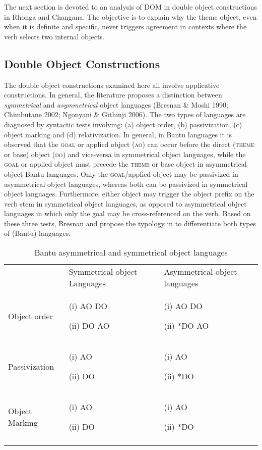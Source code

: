 \documentclass[output=paper]{langsci/langscibook}
\begin{document}
The next section is devoted to an analysis of DOM in double object constructions in Rhonga and Changana. The objective is to explain why the theme object, even when it is definite and specific, never triggers agreement in contexts where the verb selects two internal objects.

\subsection{Double Object Constructions}

{The d}ouble object constructions examined here all involve applicative constructions. {In general, }the literature proposes a distinction between \textit{symmetrical} and \textit{asymmetrical} object languages (Bresnan \& Moshi 1990; Chimbutane 2002; Ngonyani \& Githinji 2006). The two types of languages are diagnosed by syntactic tests involving: (a) object order, (b) passivization, (c) object marking and (d) relativization. In general, in Bantu languages it is observed that the \textsc{goal} or applied object (\textsc{ao}) can occur before the direct (\textsc{theme} or base) object (\textsc{do}) and vice-versa in symmetrical object languages, while the \textsc{goal} or applied object must precede the \textsc{theme} or base object in asymmetrical object Bantu languages. Only the \textsc{goal}/applied object may be passivized in asymmetrical object languages, whereas both can be passivized in symmetrical object languages. Furthermore, either object may trigger the object prefix on the verb stem in symmetrical object languages, as opposed to asymmetrical object languages in which only the goal may be cross-referenced on the verb. Based on these three tests, Bresnan and \citet{Moshi1990} propose the typology in  to differentiate both types of (Bantu) languages.

\begin{table}
\caption{Bantu asymmetrical and symmetrical object languages}
\label{tab:3}


\begin{tabularx}{\textwidth}{XXX} & Symmetrical object Languages& Asymmetrical object languages\\
\lsptoprule
 Object order& {(i) AO DO}

 (ii) DO AO& (i) AO DO

 (ii) *DO AO\\
 Passivization& (i) AO

 (ii) DO& (i) AO

 (ii) *DO\\
 Object Marking& (i) AO

 (ii) DO& (i) AO

 (ii) *DO\\
\lspbottomrule
\end{tabularx}
\end{table}
\end{document}
